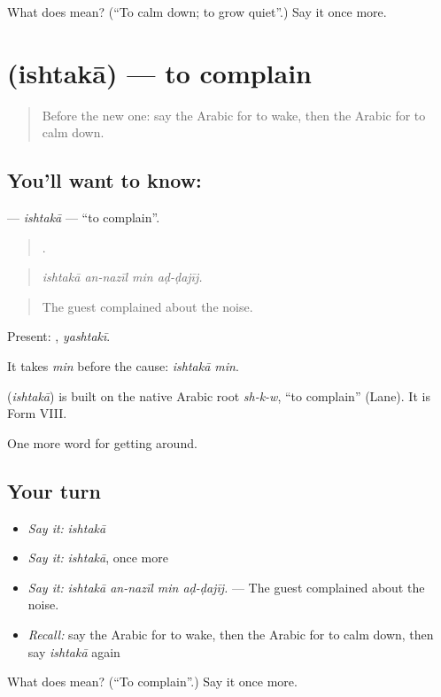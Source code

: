 \begin{tcolorbox}[breakable,colback=teal!4,colframe=teal!35!black,title={Before you move on}]
What does  mean? (\textquotedblleft{}To calm down; to grow quiet\textquotedblright{}.) Say it once more.
\end{tcolorbox}
\section[\texorpdfstring{\ar{اشتكى} (ishtakā)}{اشتكى (ishtakā)}]{ (ishtakā) — to complain}

\label{lesson:AR-C448-ishtaka}



\begin{quote}
Before the new one: say the Arabic for to wake, then the Arabic for to calm down.
\end{quote}

\subsection*{You'll want to know: }
\textbf{} — \emph{ishtakā} — \textquotedblleft{}to complain\textquotedblright{}.

\begin{quote}
   .
\end{quote}

\begin{quote}
\emph{ishtakā an-nazīl min aḍ-ḍajīj.}
\end{quote}

\begin{quote}
The guest complained about the noise.
\end{quote}

Present: , \emph{yashtakī}.

It takes \emph{min} before the cause: \emph{ishtakā min}.

\begin{cousinweb}
\textbf{} (\emph{ishtakā}) is built on the native Arabic root \emph{sh-k-w}, \textquotedblleft{}to complain\textquotedblright{} (Lane). It is Form VIII.
\end{cousinweb}

\begin{grammarlens}[title={What you've built}]
One more word for getting around.
\end{grammarlens}

\subsection*{Your turn}
\begin{itemize}
\raggedright
  \item \emph{Say it:} \emph{ishtakā}
  \item \emph{Say it:} \emph{ishtakā}, once more
  \item \emph{Say it:} \emph{ishtakā an-nazīl min aḍ-ḍajīj.} — The guest complained about the noise.
  \item \emph{Recall:} say the Arabic for to wake, then the Arabic for to calm down, then say \emph{ishtakā} again
\end{itemize}

\begin{tcolorbox}[breakable,colback=teal!4,colframe=teal!35!black,title={Before you move on}]
What does  mean? (\textquotedblleft{}To complain\textquotedblright{}.) Say it once more.
\end{tcolorbox}
